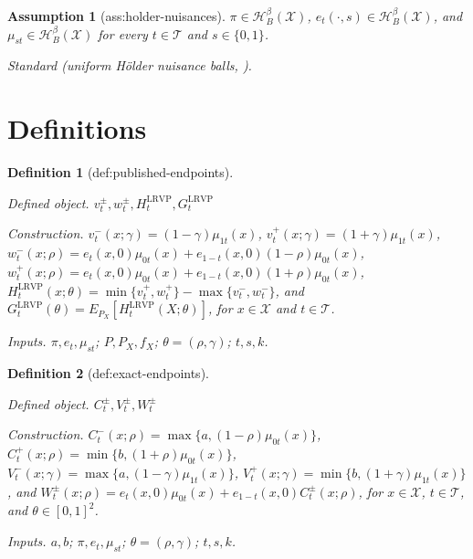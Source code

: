 \documentclass{article}
\newtheorem{assumption}{Assumption}
\newtheorem{definition}{Definition}
\begin{document}
\begin{assumption}[ass:holder-nuisances]\label{ass:holder-nuisances}
\(\pi\in\mathcal H_B^\beta(\mathcal X)\), \(e_t(\cdot,s)\in\mathcal H_B^\beta(\mathcal X)\), and \(\mu_{st}\in\mathcal H_B^\beta(\mathcal X)\) for every \(t\in\mathcal T\) and \(s\in\{0,1\}\).
\par\smallskip\noindent\emph{Standard} (uniform Hölder nuisance balls, \cite{Newey1997}).
\end{assumption}

\section{Definitions}

\begin{definition}[def:published-endpoints]\label{def:published-endpoints}
\par\smallskip\noindent\emph{Defined object.} \(v_t^\pm,w_t^\pm,H_t^{\mathrm{LRVP}},G_t^{\mathrm{LRVP}}\)
\par\smallskip\noindent\emph{Construction.} \(v_t^-(x;\gamma)=(1-\gamma)\mu_{1t}(x)\), \(v_t^+(x;\gamma)=(1+\gamma)\mu_{1t}(x)\), \(w_t^-(x;\rho)=e_t(x,0)\mu_{0t}(x)+e_{1-t}(x,0)(1-\rho)\mu_{0t}(x)\), \(w_t^+(x;\rho)=e_t(x,0)\mu_{0t}(x)+e_{1-t}(x,0)(1+\rho)\mu_{0t}(x)\), \(H_t^{\mathrm{LRVP}}(x;\theta)=\min\{v_t^+,w_t^+\}-\max\{v_t^-,w_t^-\}\), and \(G_t^{\mathrm{LRVP}}(\theta)=E_{P_X}[H_t^{\mathrm{LRVP}}(X;\theta)]\), for \(x\in\mathcal X\) and \(t\in\mathcal T\).
\par\smallskip\noindent\emph{Inputs.} \(\pi,e_t,\mu_{st}\); \(P,P_X,f_X\); \(\theta=(\rho,\gamma)\); \(t,s,k\).
\end{definition}

\begin{definition}[def:exact-endpoints]\label{def:exact-endpoints}
\par\smallskip\noindent\emph{Defined object.} \(C_t^\pm,V_t^\pm,W_t^\pm\)
\par\smallskip\noindent\emph{Construction.} \(C_t^-(x;\rho)=\max\{a,(1-\rho)\mu_{0t}(x)\}\), \(C_t^+(x;\rho)=\min\{b,(1+\rho)\mu_{0t}(x)\}\), \(V_t^-(x;\gamma)=\max\{a,(1-\gamma)\mu_{1t}(x)\}\), \(V_t^+(x;\gamma)=\min\{b,(1+\gamma)\mu_{1t}(x)\}\), and \(W_t^\pm(x;\rho)=e_t(x,0)\mu_{0t}(x)+e_{1-t}(x,0)C_t^\pm(x;\rho)\), for \(x\in\mathcal X\), \(t\in\mathcal T\), and \(\theta\in[0,1]^2\).
\par\smallskip\noindent\emph{Inputs.} \(a,b\); \(\pi,e_t,\mu_{st}\); \(\theta=(\rho,\gamma)\); \(t,s,k\).
\end{definition}
\end{document}
